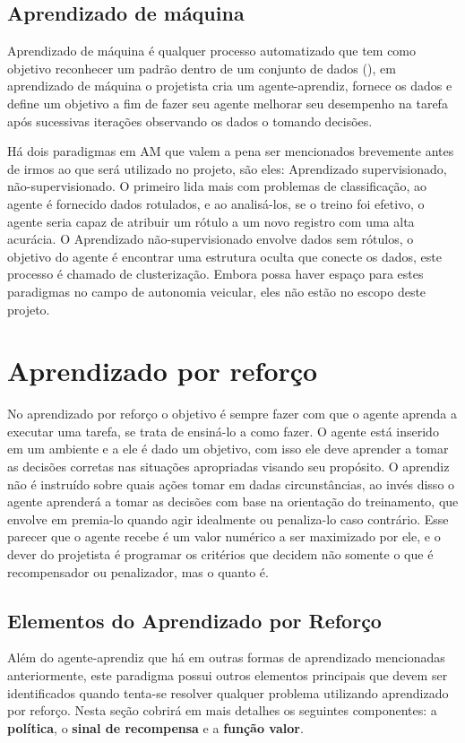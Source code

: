 \subsection{Aprendizado de máquina}
Aprendizado de máquina é qualquer processo automatizado que tem como objetivo reconhecer um padrão dentro de um conjunto de dados (), em aprendizado de máquina o projetista cria um agente-aprendiz, fornece os dados e define um objetivo a fim de fazer seu agente melhorar seu desempenho na tarefa após sucessivas iterações observando os dados o tomando decisões. 

Há dois paradigmas em AM que valem a pena ser mencionados brevemente antes de irmos ao que será utilizado no projeto, são eles: Aprendizado supervisionado, não-supervisionado. O primeiro lida mais com problemas de classificação, ao agente é fornecido dados rotulados, e ao analisá-los, se o treino foi efetivo, o agente seria capaz de atribuir um rótulo a um novo registro com uma alta acurácia. O Aprendizado não-supervisionado envolve dados sem rótulos, o objetivo do agente é encontrar uma estrutura oculta que conecte os dados, este processo é chamado de clusterização. Embora possa haver espaço para estes paradigmas no campo de autonomia veicular, eles não estão no escopo deste projeto.

\section{Aprendizado por reforço}
No aprendizado por reforço o objetivo é sempre fazer com que o agente aprenda a executar uma tarefa, se trata de ensiná-lo a como fazer. O agente está inserido em um ambiente e a ele é dado um objetivo, com isso ele deve aprender a tomar as decisões corretas nas situações apropriadas visando seu propósito. O aprendiz não é instruído sobre quais ações tomar em dadas circunstâncias, ao invés disso o agente aprenderá a tomar as decisões com base na orientação do treinamento, que envolve em premia-lo quando agir idealmente ou penaliza-lo caso contrário. Esse parecer que o agente recebe é um valor numérico a ser maximizado por ele, e o dever do projetista é programar os critérios que decidem não somente o que é recompensador ou penalizador, mas o quanto é.

\subsection{Elementos do Aprendizado por Reforço}
Além do agente-aprendiz que há em outras formas de aprendizado mencionadas anteriormente, este paradigma possui outros elementos principais que devem ser identificados quando tenta-se resolver qualquer problema utilizando aprendizado por reforço. Nesta seção cobrirá em mais detalhes os seguintes componentes: a \textbf{política}, o \textbf{sinal de recompensa} e a \textbf{função valor}.

